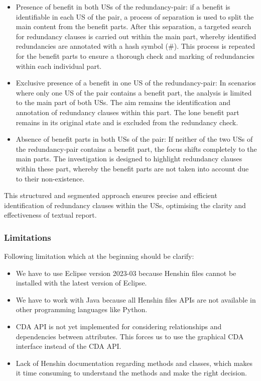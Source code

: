 \begin{itemize}
	\item Presence of benefit in both USs of the redundancy-pair: if a benefit is identifiable in each US of the pair, a process of separation is used to split the main content from the benefit parts. After this separation, a targeted search for redundancy clauses is carried out within the main part, whereby identified redundancies are annotated with a hash symbol (\#). This process is repeated for the benefit parts to ensure a thorough check and marking of redundancies within each individual part.
	\item Exclusive presence of a benefit in one US of the redundancy-pair: In scenarios where only one US of the pair contains a benefit part, the analysis is limited to the main part of both USs. The aim remains the identification and annotation of redundancy clauses within this part. The lone benefit part remains in its original state and is excluded from the redundancy check.

	\item Absence of benefit parts in both USs of the pair: If neither of the two USs of the redundancy-pair contains a benefit part, the focus shifts completely to the main parts. The investigation is designed to highlight redundancy clauses within these part, whereby the benefit parts are not taken into account due to their non-existence.
\end{itemize}
This structured and segmented approach ensures precise and efficient identification of redundancy clauses within the USs, optimising the clarity and effectiveness of textual report.

\subsubsection*{Limitations}
Following limitation which at the beginning should be clarify:
\begin{itemize}
	\item We have to use Eclipse version 2023-03 because Henshin files cannot be installed with the latest version of Eclipse.
	\item We have to work with Java because all Henshin files APIs are not available in other programming languages like Python.
	\item CDA API is not yet implemented for considering relationships and dependencies between attributes. This forces us to use the graphical CDA interface instead of the CDA API.
	\item Lack of Henshin documentation regarding methods and classes, which makes it time consuming to understand the methods and make the right decision.
\end{itemize}


